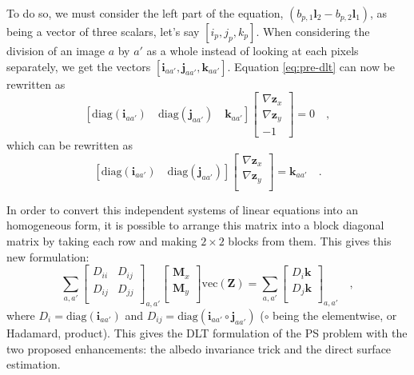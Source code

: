 To do so, we must consider the left part of the equation, $\left( b_{p,1} \mathbf{l}_2 - b_{p,2} \mathbf{l}_1 \right)$, as being a vector of three scalars, let's say $\left[ i_p, j_p, k_p \right]$. When considering the division of an image $a$ by $a'$ as a whole instead of looking at each pixels separately, we get the vectors $\left[ \mathbf{i}_{aa'}, \mathbf{j}_{aa'}, \mathbf{k}_{aa'} \right]$. Equation \eqref{eq:pre-dlt} can now be rewritten as
\begin{equation}
\left[ \mathrm{diag}(\mathbf{i}_{aa'}) \quad \mathrm{diag}(\mathbf{j}_{aa'}) \quad \mathbf{k}_{aa'}\right]
\begin{bmatrix}
\nabla \mathbf{z}_{x} \\
\nabla \mathbf{z}_{y} \\
-1
\end{bmatrix}
= 0 \quad,
\end{equation}
which can be rewritten as
\begin{equation}
\left[ \mathrm{diag}(\mathbf{i}_{aa'}) \quad \mathrm{diag}(\mathbf{j}_{aa'}) \right]
\begin{bmatrix}
\nabla \mathbf{z}_{x} \\
\nabla \mathbf{z}_{y} \\
\end{bmatrix}
= \mathbf{k}_{aa'} \quad.
\end{equation}


In order to convert this independent systems of linear equations into an homogeneous form, it is possible to arrange this matrix into a block diagonal matrix by taking each row and making $2 \times 2$ blocks from them.
This gives this new formulation:
\begin{equation}
\sum_{a,a'}
\begin{bmatrix}
    D_{ii} & D_{ij} \\
    D_{ij} & D_{jj} \\
\end{bmatrix}_{a,a'}
\begin{bmatrix}
    \mathbf{M}_x \\
    \mathbf{M}_y \\
\end{bmatrix}
\mathrm{vec}(\mathbf{Z}) =
\sum_{a,a'}
\begin{bmatrix}
D_i \mathbf{k} \\
D_j \mathbf{k} \\
\end{bmatrix}_{a,a'}
\quad,
\end{equation}
where $D_i = \mathrm{diag}(\mathbf{i}_{aa'})$ and $ D_{ij} = \mathrm{diag}\left(\mathbf{i}_{aa'} \circ \mathbf{j}_{aa'}\right)$ ($\circ$ being the elementwise, or Hadamard, product). This gives the DLT formulation of the PS problem with the two proposed enhancements: the albedo invariance trick and the direct surface estimation.

